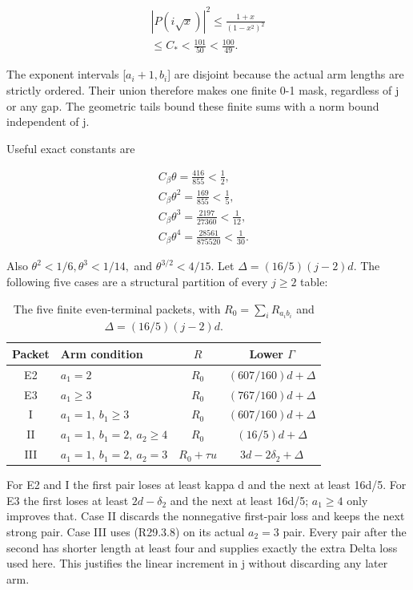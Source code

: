 \[
\begin{gathered}
|P(i\sqrt x)|^2\le\frac{1+x}{(1-x^2)^2}\\
\le C_*<\frac{101}{50}<\frac{100}{49}.
\end{gathered}\tag{R29.6.1}
\]

The exponent intervals [\(a_i+1,\allowbreak  b_i\)] are disjoint because the actual
arm lengths are strictly ordered. Their union therefore makes one
finite 0-1 mask, regardless of j or any gap. The geometric tails bound these finite sums with a norm bound independent
of j.

Useful exact constants are

\[
\begin{gathered}
C_\beta\theta=\frac{416}{855}<\frac12,\quad\\
C_\beta\theta^2=\frac{169}{855}<\frac15,\quad\\
C_\beta\theta^3=\frac{2197}{27360}<\frac1{12},\quad\\
C_\beta\theta^4=\frac{28561}{875520}<\frac1{30}.
\end{gathered}\tag{R29.6.2}
\]

Also \(\theta^2<1/6,\allowbreak  \theta^3<1/14,\allowbreak \) and \(\theta^{3/2}<4/15.\)
Let \(\Delta=(16/5)(j-2)d\). The following five cases are a
structural partition of every \(j\ge 2\) table:

\begin{table}[htbp]
\centering\small
\setlength{\tabcolsep}{5pt}
\caption{The five finite even-terminal packets, with $R_0=\sum_iR_{a_i b_i}$ and $\Delta=(16/5)(j-2)d$.}\label{tab:oc:r29-structure}
\begin{tabular}{clcc}
\toprule
Packet & Arm condition & $R$ & Lower $\Gamma$\\
\midrule
E2 & $a_1=2$ & $R_0$ & $(607/160)d+\Delta$\\
E3 & $a_1\ge3$ & $R_0$ & $(767/160)d+\Delta$\\
I & $a_1=1,\ b_1\ge3$ & $R_0$ & $(607/160)d+\Delta$\\
II & $a_1=1,\ b_1=2,\ a_2\ge4$ & $R_0$ & $(16/5)d+\Delta$\\
III & $a_1=1,\ b_1=2,\ a_2=3$ & $R_0+\tau u$ & $3d-2\delta_2+\Delta$\\
\bottomrule
\end{tabular}
\end{table}

For E2 and I the first pair loses at least kappa d and the next at
least 16d/5. For E3 the first loses at least \(2d-\delta_2\) and the next at
least 16d/5; \(a_1\ge 4\) only improves that. Case II discards the
nonnegative first-pair loss and keeps the next strong pair. Case III
uses (R29.3.8) on its actual \(a_2=3\) pair. Every pair after the second has
shorter length at least four and supplies exactly the extra Delta
loss used here. This justifies the linear increment in j without
discarding any later arm.

